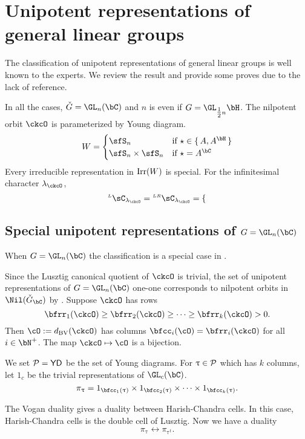 \documentclass[counting_main.tex]{subfiles}
\begin{document}
\section{Unipotent representations of general linear groups}

The classification of unipotent representations of general linear groups is well
known to the experts. We review the result and provide some proves due to the
lack of reference.

%
In all the cases, $\ckG = \GL_{n}(\bC)$ and $n$ is even if
$G = \GL_{\half n}{\bH}$.
The nilpotent orbit $\ckcO$ is parameterized by Young diagram.
\[
  W = \begin{cases}
    \sfS_{n} & \text{if } \star \in \set{A, A^{\bH}}\\
    \sfS_{n}\times \sfS_{n} & \text{if } \star = A^{\bC}\\
  \end{cases}
\]
Every irreducible representation in $\mathrm{Irr}(W)$ is special.
For the infinitesimal character $\lamck$,
\[
  \LC_{\lamck} = \LRC_{\lamck}= \begin{cases}

  \end{cases}
\]

\subsection{Special unipotent representations of $G = \GL_n(\bC)$}
When $G = \GL_{n}(\bC)$ the classification is a special case in \cite{BVUni}.

Since the Lusztig canonical quotient of $\ckcO$ is trivial, the set of unipotent representations
of $G = \GL_n(\bC)$ one-one corresponds to nilpotent orbits in $\Nil(\ckGc)$ by
\cite{BVUni}.
Suppose $\ckcO$ has rows
\[
\bfrr_1(\ckcO)\geq \bfrr_2(\ckcO)\geq \cdots\geq
\bfrr_k(\ckcO) >0.
\]
Then $\cO := \dBV(\ckcO)$ has columns $\bfcc_i(\cO) = \bfrr_i(\ckcO)$ for all
$i\in \bN^+$.
The map $\ckcO \mapsto \cO$ is a bijection.


We set $\mathcal{P} =  \mathsf{YD}$ be the set of Young diagrams.
For $\uptau \in \mathcal{P}$ which has $k$ columns,
let $1_{c}$ be the trivial representations of $\GL_c(\bC)$.
\[
 \pi_\uptau = 1_{\bfcc_1(\uptau)}\times  1_{\bfcc_2(\uptau)}\times \cdots
 \times 1_{\bfcc_k(\uptau)}.
\]

The Vogan duality gives a duality between Harish-Chandra cells.
In this case, Harish-Chandra cells is the double cell
of Lusztig.
Now we have a duality
\[
 \pi_\uptau \leftrightarrow \pi_{\uptau^t}.
\]
\end{document}
